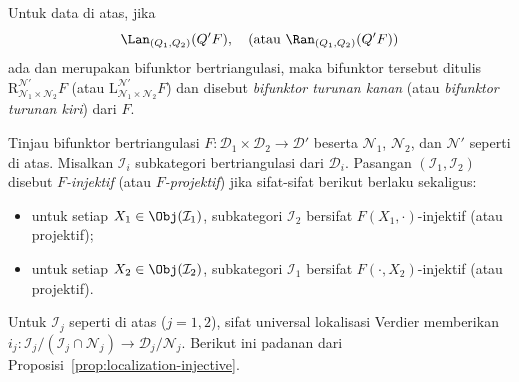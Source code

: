 \begin{definisi}\label{def:bifunctor-triangulated-localization}
	Untuk data di atas, jika
	\[ \Lan_{(Q_1, Q_2)} (Q' F), \quad \text{(atau $\Ran_{(Q_1, Q_2)}(Q' F)$)} \]
	ada dan merupakan bifunktor bertriangulasi, maka bifunktor tersebut ditulis
	$\mathrm{R}^{\mathcal{N}'}_{\mathcal{N}_1\times\mathcal{N}_2}F$ (atau
	$\mathrm{L}^{\mathcal{N}'}_{\mathcal{N}_1\times\mathcal{N}_2}F$) dan
	disebut \emph{bifunktor turunan kanan} (atau \emph{bifunktor turunan kiri})
	dari $F$.
\end{definisi}

\begin{definisi}\label{def:F-injective-bifunctor}
	Tinjau bifunktor bertriangulasi
	$F:\mathcal{D}_1\times\mathcal{D}_2\to\mathcal{D}'$ beserta
	$\mathcal{N}_1$, $\mathcal{N}_2$, dan $\mathcal{N}'$ seperti di atas.
	Misalkan $\mathcal{I}_i$ subkategori bertriangulasi dari $\mathcal{D}_i$.
	Pasangan $(\mathcal{I}_1,\mathcal{I}_2)$ disebut \emph{$F$-injektif}
	(atau \emph{$F$-projektif}) jika sifat-sifat berikut berlaku sekaligus:
	\begin{itemize}
		\item untuk setiap $X_1\in\Obj(\mathcal{I}_1)$, subkategori
		$\mathcal{I}_2$ bersifat $F(X_1,\cdot)$-injektif (atau projektif);
		\item untuk setiap $X_2\in\Obj(\mathcal{I}_2)$, subkategori
		$\mathcal{I}_1$ bersifat $F(\cdot,X_2)$-injektif (atau projektif).
	\end{itemize}
\end{definisi}

Untuk $\mathcal{I}_j$ seperti di atas ($j=1,2$), sifat universal lokalisasi
Verdier memberikan
$i_j:\mathcal{I}_j/(\mathcal{I}_j\cap\mathcal{N}_j)
	\to\mathcal{D}_j/\mathcal{N}_j$. Berikut ini padanan dari
Proposisi~\ref{prop:localization-injective}.

